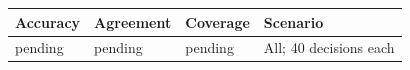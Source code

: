 \begin{tabular}{llll}
Accuracy & Agreement & Coverage & Scenario \\
\hline
pending & pending & pending & All; 40 decisions each \\
\end{tabular}
